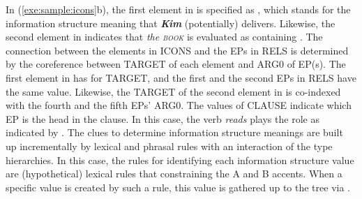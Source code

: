 

\noindent In (\ref{exe:sample:icons}b), the first element in  is
specified as , which stands for the information
structure meaning that \textit{\textbf{Kim}} (potentially)
delivers. Likewise, the second element in  indicates that
\textit{the \textsc{book}} is evaluated as containing
.  The connection between the elements in ICONS
and the EPs in RELS is determined by the coreference between TARGET of
each  element and ARG0 of EP(s). The first element in  has
 for TARGET, and the first and the second EPs in RELS
have the same value. Likewise, the TARGET of the second element in
 is co-indexed with the fourth and the fifth EPs' ARG0. The
values of CLAUSE indicate which EP is the head in the clause. In this
case, the verb \textit{reads} plays the role as indicated by
.  The clues to determine information structure
meanings are built up incrementally by lexical and phrasal rules with
an interaction of the type hierarchies. In this case, the rules for
identifying each information structure value are (hypothetical)
lexical rules that constraining the A and B accents.  When a specific
 value is created by such a rule, this value is gathered
up to the tree via  .


